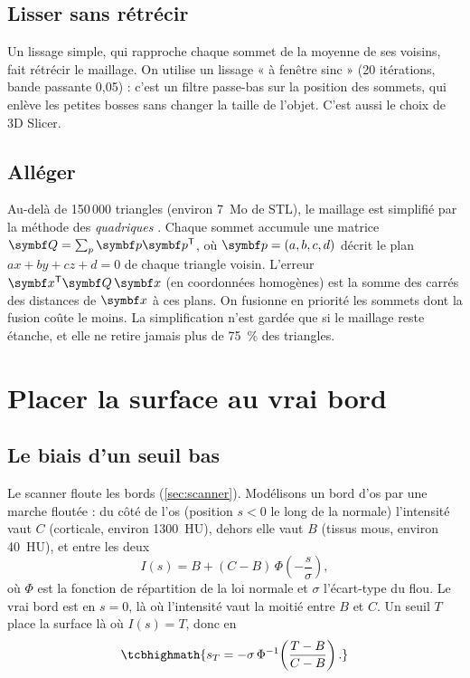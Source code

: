 \subsection{Lisser sans rétrécir}

Un lissage simple, qui rapproche chaque sommet de la moyenne de ses voisins, fait rétrécir le maillage. On utilise un
lissage « à fenêtre sinc » \cite{taubin1995} (20 itérations, bande passante 0,05) : c'est un filtre passe-bas sur la
position des sommets, qui enlève les petites bosses sans changer la taille de l'objet. C'est aussi le choix de 3D
Slicer.

\subsection{Alléger}

Au-delà de 150\,000 triangles (environ 7~Mo de STL), le maillage est simplifié par la méthode des \emph{quadriques}
\cite{garland1997}. Chaque sommet accumule une matrice $\mt{Q} = \sum_{p} \vb{p}\vb{p}^{\mathsf T}$, où
$\vb{p} = (a, b, c, d)$ décrit le plan $ax + by + cz + d = 0$ de chaque triangle voisin. L'erreur
$\vb{x}^{\mathsf T}\mt{Q}\,\vb{x}$ (en coordonnées homogènes) est la somme des carrés des distances de $\vb{x}$ à ces
plans. On fusionne en priorité les sommets dont la fusion coûte le moins. La simplification n'est gardée que si le
maillage reste étanche, et elle ne retire jamais plus de 75~\% des triangles.

\section{Placer la surface au vrai bord}
\label{sec:demi-hauteur}

\subsection{Le biais d'un seuil bas}

Le scanner floute les bords (\cref{sec:scanner}). Modélisons un bord d'os par une marche floutée : du côté de l'os
(position $s < 0$ le long de la normale) l'intensité vaut $C$ (corticale, environ 1300~HU), dehors elle vaut $B$
(tissus mous, environ 40~HU), et entre les deux
\begin{equation}
  I(s) = B + (C - B)\,\Phi\!\left(-\frac{s}{\sigma}\right),
  \label{eq:bord}
\end{equation}
où $\Phi$ est la fonction de répartition de la loi normale et $\sigma$ l'écart-type du flou. Le vrai bord est en
$s = 0$, là où l'intensité vaut la moitié entre $B$ et $C$. Un seuil $T$ place la surface là où $I(s) = T$, donc en
\begin{equation}
  \tcbhighmath{s_T = -\sigma\,\Phi^{-1}\!\left(\frac{T - B}{C - B}\right).}
  \label{eq:biais}
\end{equation}

